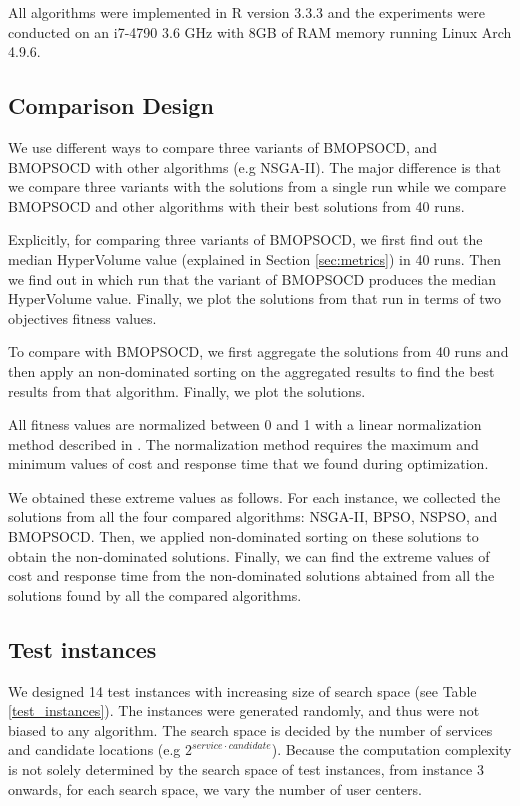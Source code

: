 \documentclass[10pt,journal,compsoc]{IEEEtran}
\begin{document}
All algorithms were implemented in R version 3.3.3 and the experiments were conducted on an i7-4790 3.6 GHz with 8GB of RAM memory running Linux Arch 4.9.6.
\subsection{Comparison Design}
We use different ways to compare three variants of BMOPSOCD, and BMOPSOCD with other algorithms (e.g NSGA-II). The major difference is that we compare three variants with the solutions from a single run while we compare BMOPSOCD and other algorithms with their best solutions from 40 runs.

Explicitly, for comparing three variants of BMOPSOCD, we first find out the median HyperVolume value (explained in Section \ref{sec:metrics}) in 40 runs. Then we find out in which run that the variant of BMOPSOCD produces the median HyperVolume value. Finally, we plot the solutions from that run in terms of two objectives fitness values.

To compare with BMOPSOCD, we first aggregate the solutions from 40 runs and then apply an non-dominated sorting on the aggregated results to find the best results from that algorithm. Finally, we plot the solutions. 

All fitness values are normalized between 0 and 1 with a linear normalization method described in \cite{Tan2016}. 
The normalization method requires the maximum and minimum values of cost and response time 
that we found during optimization. 

We obtained these extreme values as follows. For each instance, we collected the solutions from all the four compared algorithms: NSGA-II, BPSO, NSPSO, and BMOPSOCD. Then, we applied non-dominated sorting on these solutions to obtain the non-dominated solutions. Finally, we can find the extreme values of cost and response time from the non-dominated solutions abtained from all the solutions found by all the compared algorithms.

\subsection{Test instances}
\label{sec:datasets}





We designed 14 test instances with increasing size of search space (see Table \ref{test_instances}). The instances were generated randomly, and thus were not biased to any algorithm. The search space is decided by the number of services and candidate locations (e.g $2^{service \cdot candidate}$). Because the computation complexity is not solely determined by the search space of test instances, from instance 3 onwards, for each search space, we vary the number of user centers. 
\end{document}
